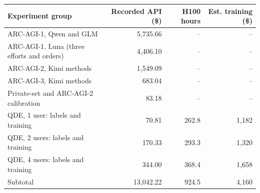 \begin{tabular}{lrrr}
\toprule
Experiment group & Recorded API (\$) & H100 hours & Est. training (\$) \\
\midrule
ARC-AGI-1, Qwen and GLM & 5,735.66 & -- & -- \\
ARC-AGI-1, Luna (three efforts and orders) & 4,406.10 & -- & -- \\
ARC-AGI-2, Kimi methods & 1,549.09 & -- & -- \\
ARC-AGI-3, Kimi methods & 683.04 & -- & -- \\
Private-set and ARC-AGI-2 calibration & 83.18 & -- & -- \\
QDE, 1 user: labels and training & 70.81 & 262.8 & 1,182 \\
QDE, 2 users: labels and training & 170.33 & 293.3 & 1,320 \\
QDE, 4 users: labels and training & 344.00 & 368.4 & 1,658 \\
\midrule
Subtotal & 13,042.22 & 924.5 & 4,160 \\
\bottomrule
\end{tabular}
